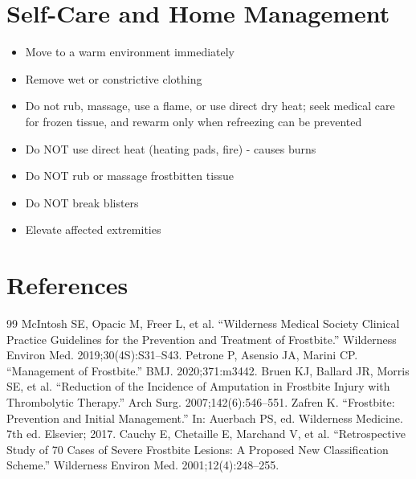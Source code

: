 \section*{Self-Care and Home Management}
\begin{itemize}
\item Move to a warm environment immediately
\item Remove wet or constrictive clothing
\item Do not rub, massage, use a flame, or use direct dry heat; seek medical care for frozen tissue, and rewarm only when refreezing can be prevented
\item Do NOT use direct heat (heating pads, fire) - causes burns
\item Do NOT rub or massage frostbitten tissue
\item Do NOT break blisters
\item Elevate affected extremities
\end{itemize}

\section*{References}
\begin{thebibliography}{99}
 McIntosh SE, Opacic M, Freer L, et al. ``Wilderness Medical Society Clinical Practice Guidelines for the Prevention and Treatment of Frostbite.'' Wilderness Environ Med. 2019;30(4S):S31--S43.
 Petrone P, Asensio JA, Marini CP. ``Management of Frostbite.'' BMJ. 2020;371:m3442.
 Bruen KJ, Ballard JR, Morris SE, et al. ``Reduction of the Incidence of Amputation in Frostbite Injury with Thrombolytic Therapy.'' Arch Surg. 2007;142(6):546--551.
 Zafren K. ``Frostbite: Prevention and Initial Management.'' In: Auerbach PS, ed. Wilderness Medicine. 7th ed. Elsevier; 2017.
 Cauchy E, Chetaille E, Marchand V, et al. ``Retrospective Study of 70 Cases of Severe Frostbite Lesions: A Proposed New Classification Scheme.'' Wilderness Environ Med. 2001;12(4):248--255.
\end{thebibliography}
